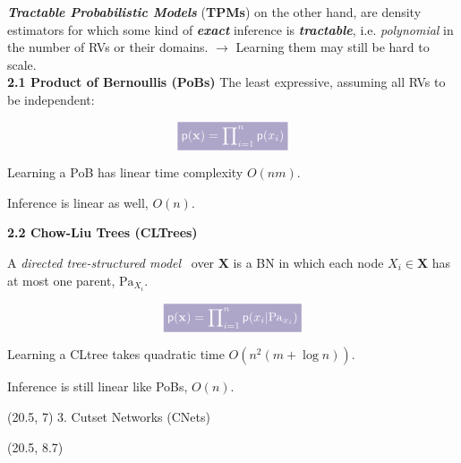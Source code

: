 \documentclass[final]{beamer}
\newcommand{\highlight}[2][yellow]{\mathchoice%
  {\colorbox{#1}{\strut\textcolor{white}{$\displaystyle{#2}$}}}%
  {\colorbox{#1}{\strut\textcolor{white}{$\textstyle{#2}$}}}%
  {\colorbox{#1}{\strut\textcolor{white}{$\scriptstyle{#2}$}}}%
  {\colorbox{#1}{\strut\textcolor{white}{$\scriptscriptstyle{#2}$}}}}%
\begin{document}
\begin{frame}{}
\begin{textblock}{17.5}
    
    \emph{\textbf{Tractable Probabilistic Models} }  (\textbf{TPMs})
    on the other hand, are density estimators for which some kind of  \textbf{\emph{exact}} inference is
    \textbf{\emph{tractable}}, i.e. \emph{polynomial} in the number of RVs or their
    domains.
    \hfill$\rightarrow$ Learning them may still be hard to scale.\\[20pt]

    
    {\bf 2.1 Product of Bernoullis (PoBs)}
    The least expressive, assuming all RVs to be independent:
    
    $$\highlight[lacamlightlilac]{\mathsf{p}(\mathbf{x}) =\prod\nolimits_{i=1}^{n}\mathsf{p}(x_{i})}$$

    Learning a PoB has linear time complexity $O(nm)$.\par
    Inference is linear as well, $O(n)$.
    \vspace{20pt}

    {\bf 2.2 Chow-Liu Trees (CLTrees)}

    A \emph{directed tree-structured model}~\cite{Meila2000} over
    $\mathbf{X}$ is a BN in which each node $X_{i}\in\mathbf{X}$ has at most one
    parent, $\mathrm{Pa}_{X_i}$.

    $$\highlight[lacamlightlilac]{\mathsf{p}(\mathbf{x}) =
    \prod\nolimits_{i=1}^n\mathsf{p}(x_i|\mathrm{Pa}_{x_i})}$$

    Learning a \textsf{CLtree} takes  quadratic time $O(n^2(m + \log n))$.\par
    Inference is still linear like \textsf{PoBs}, $O(n)$.
  \end{textblock}

  

  \begin{textblock}{17.5}(20.5, 7)
    3. Cutset Networks (CNets)
  \end{textblock}
  
  \begin{textblock}{17.5}(20.5, 8.7)
    \small


\end{textblock}
\end{frame}
\end{document}
